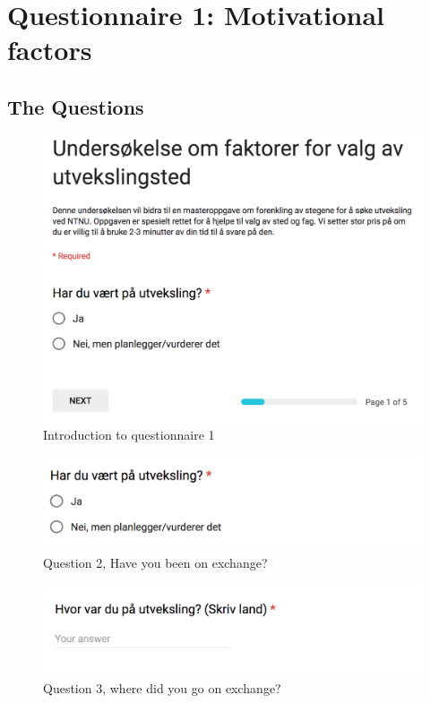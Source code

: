 \chapter{Questionnaire 1: Motivational factors}
\label{app:questionnaire1}

\section*{The Questions} 

\begin{figure}[h]
    \centering
\includegraphics[width=1\textwidth]{fig/form1/intro.png}
    \caption[]{Introduction to questionnaire 1}
    \label{fig:q11}
\end{figure}

\begin{figure}[h]
    \centering
    
\includegraphics[width=1\textwidth]{fig/form1/exchange.png}
    \caption[]{Question 2, Have you been on exchange?}
    \label{fig:q12}
\end{figure}

\begin{figure}[h]
    \centering
\includegraphics[width=1\textwidth]{fig/form1/where.png}
    \caption[]{Question 3, where did you go on exchange?}
    \label{fig:q13}
\end{figure}

